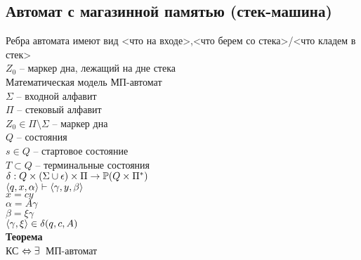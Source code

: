 \documentclass[12pt]{article}
\begin{document}
\subsection{Автомат с магазинной памятью (стек-машина)}
Ребра автомата имеют вид <что на входе>,<что берем со стека>/<что кладем в стек>\\
$Z_0$ -- маркер дна, лежащий на дне стека\\
Математическая модель МП-автомат\\
$\Sigma$ -- входной алфавит\\
$\Pi$ -- стековый алфавит\\
$Z_0 \in \Pi\setminus \Sigma$ -- маркер дна\\
$Q$ -- состояния\\
$s \in Q$ -- стартовое состояние\\
$T \subset Q$ -- терминальные состояния\\
$\delta: Q \times (\Sigma \cup \epsilon) \times \Pi \rightarrow \mathbb{P}(Q\times \Pi^*)$\\
$\langle q, x, \alpha\rangle \vdash \langle \gamma, y, \beta \rangle$\\
$x = cy$\\
$\alpha = A\gamma$\\
$\beta = \xi \gamma$\\
$\langle \gamma, \xi \rangle \in \delta(q, c, A)$\\
\textbf{Теорема}\\
КС $\Leftrightarrow \exists\,$ МП-автомат
\end{document}
